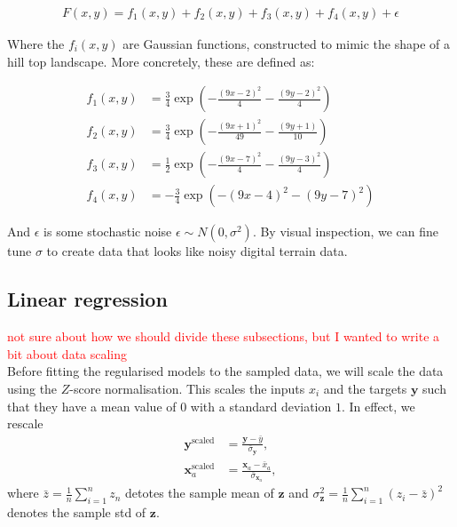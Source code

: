 \documentclass[twocolumn,english,notitlepage]{article}
\newcommand{\comment}[1]{\textcolor{red}{#1}\\}
\renewcommand{\vec}[1]{\boldsymbol{#1}}
\newcommand{\pclosed}[1]{\left(#1\right)}
\newcommand{\exptext}[1]{\operatorname{exp}\pclosed{#1}}
\begin{document}
    \begin{align}
        F(x,y) = f_1(x,y) + f_2(x,y) + f_3(x,y) + f_4(x,y) + \epsilon \label{eq:met:Franke_Function}
    \end{align}

    Where the $f_i(x,y)$ are Gaussian functions, constructed to mimic the shape of a hill top landscape. More concretely, these are defined as:

    \begin{align} \nonumber
        f_1(x,y) &= \frac{3}{4}\exptext{ -\frac{(9x-2)^2}{4} - \frac{(9y-2)^2}{4} } \nonumber \\
        f_2(x,y) &= \frac{3}{4}\exptext{ -\frac{(9x+1)^2}{49} - \frac{(9y+1)}{10}} \nonumber \\
        f_3(x,y) &= \frac{1}{2}\exptext{ -\frac{(9x-7)^2}{4} - \frac{(9y-3)^2}{4}} \nonumber \\
        f_4(x,y) &= -\frac{3}{4}\exptext{ -(9x-4)^2 - (9y-7)^2} \nonumber
    \end{align}

    And $\epsilon$ is some stochastic noise $\epsilon \sim N(0,\sigma^2)$. By visual inspection, we can fine tune $\sigma$ to create data that looks like noisy digital terrain data.
    
    \subsection{Linear regression}
    \comment{not sure about how we should divide these subsections, but I wanted to write a bit about data scaling}
    Before fitting the regularised models to the sampled data, we will scale the data using the $Z$-score normalisation. This scales the inputs $x_i$ and the targets $\vec{y}$ such that they have a mean value of $0$ with a standard deviation $1$. In effect, we rescale
    \begin{subequations}
        \begin{align}
            \vec{y}^\text{scaled} &= \frac{\vec{y}-\bar{y}}{\bar{\sigma}_{\vec{y}}}, \\
            \vec{x}_a^\text{scaled} &= \frac{\vec{x}_a - \bar{x}_a}{\bar{\sigma}_{\vec{x}_a}},
        \end{align}
    \end{subequations}
    where $\bar{z} = \frac{1}{n} \sum_{i=1}^n z_n$ detotes the sample mean of $\vec{z}$ and $\sigma_{\vec{z}}^2 = \frac{1}{n} \sum_{i=1}^n {(z_i-\bar{z})}^2$ denotes the sample std of $\vec{z}$.
\end{document}
